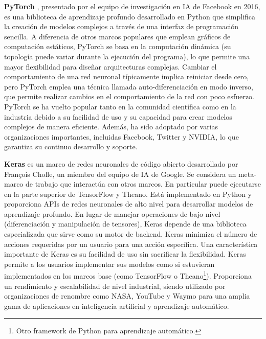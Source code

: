 \textbf{PyTorch} \citep{pytorch}, presentado por el equipo de investigación en IA de Facebook en 2016, es una biblioteca de aprendizaje profundo desarrollado en Python que simplifica la creación de modelos complejos a través de una interfaz de programación sencilla. A diferencia de otros marcos populares que emplean gráficos de computación estáticos, PyTorch se basa en la computación dinámica (su topología puede variar durante la ejecución del programa), lo que permite una mayor flexibilidad para diseñar arquitecturas complejas. Cambiar el comportamiento de una red neuronal típicamente implica reiniciar desde cero, pero PyTorch emplea una técnica llamada auto-diferenciación en modo inverso, que permite realizar cambios en el comportamiento de la red con poco esfuerzo. PyTorch se ha vuelto popular tanto en la comunidad científica como en la industria debido a su facilidad de uso y su capacidad para crear modelos complejos de manera eficiente. Además, ha sido adoptado por varias organizaciones importantes, incluidas Facebook, Twitter y NVIDIA, lo que garantiza su continuo desarrollo y soporte.


\textbf{Keras} \citep{keras} es un marco de redes neuronales de código abierto desarrollado por François Cholle, un miembro del equipo de IA de Google. Se considera un meta-marco de trabajo que interactúa con otros marcos. En particular puede ejecutarse en la parte superior de TensorFlow y Theano. Está implementado en Python y proporciona APIs de redes neuronales de alto nivel para desarrollar modelos de aprendizaje profundo. En lugar de manejar operaciones de bajo nivel (diferenciación y manipulación de tensores), Keras depende de una biblioteca especializada que sirve como su motor de backend. Keras minimiza el número de acciones requeridas por un usuario para una acción específica. Una característica importante de Keras es su facilidad de uso sin sacrificar la flexibilidad. Keras permite a los usuarios implementar sus modelos como si estuvieran implementados en los marcos base (como TensorFlow o Theano\footnote{Otro framework de Python para aprendizaje automático.}). Proporciona un rendimiento y escalabilidad de nivel industrial, siendo utilizado por organizaciones de renombre como NASA, YouTube y Waymo para una amplia gama de aplicaciones en inteligencia artificial y aprendizaje automático.


